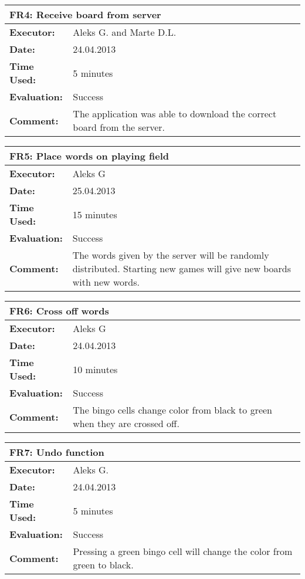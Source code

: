 \begin{tabular}{|m{}||m{}|}
\hline
\multicolumn{2}{|l|}{FR4: Receive board from server} \\ \hline
\textbf{Executor:} & Aleks G. and Marte D.L.\\ \hline
\textbf{Date:} & 24.04.2013\\ \hline
\textbf{Time Used:} & 5 minutes\\ \hline
\textbf{Evaluation:} & Success\\ \hline
\textbf{Comment:} & The application was able to download the correct board from the server.\\ \hline
\end{tabular}

\begin{tabular}{|m{}||m{}|}
\hline
\multicolumn{2}{|l|}{FR5: Place words on playing field} \\ \hline
\textbf{Executor:} & Aleks G\\ \hline
\textbf{Date:} & 25.04.2013\\ \hline
\textbf{Time Used:} & 15 minutes\\ \hline
\textbf{Evaluation:} & Success\\ \hline
\textbf{Comment:} & The words given by the server will be randomly distributed. Starting new games will give new boards with new words.\\ \hline
\end{tabular}

\begin{tabular}{|m{}||m{}|}
\hline
\multicolumn{2}{|l|}{FR6: Cross off words} \\ \hline
\textbf{Executor:} & Aleks G\\ \hline
\textbf{Date:} & 24.04.2013\\ \hline
\textbf{Time Used:} & 10 minutes\\ \hline
\textbf{Evaluation:} & Success\\ \hline
\textbf{Comment:} & The bingo cells change color from black to green when they are crossed off. \\ \hline
\end{tabular}

\begin{tabular}{|m{}||m{}|}
\hline
\multicolumn{2}{|l|}{FR7: Undo function} \\ \hline
\textbf{Executor:} & Aleks G.\\ \hline
\textbf{Date:} & 24.04.2013\\ \hline
\textbf{Time Used:} & 5 minutes \\ \hline
\textbf{Evaluation:} & Success\\ \hline
\textbf{Comment:} & Pressing a green bingo cell will change the color from green to black.\\ \hline
\end{tabular}

